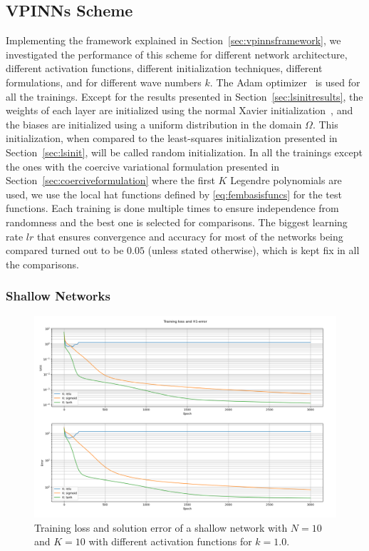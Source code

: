 \subsection{VPINNs Scheme}\label{sec:vpinnsresults}
Implementing the framework explained in Section~\ref{sec:vpinnsframework}, we investigated the performance of this scheme for different network architecture, different activation functions, different initialization techniques, different formulations, and for different wave numbers $k$. The Adam optimizer~\cite{adamoptimizer} is used for all the trainings. Except for the results presented in Section~\ref{sec:lsinitresults}, the weights of each layer are initialized using the normal Xavier initialization~\cite{xavierinitialization}, and the biases are initialized using a uniform distribution in the domain $\Omega$. This initialization, when compared to the least-squares initialization presented in Section~\ref{sec:lsinit}, will be called random initialization. In all the trainings except the ones with the coercive variational formulation presented in Section~\ref{sec:coerciveformulation} where the first $K$ Legendre polynomials are used, we use the local hat functions defined by \eqref{eq:fembasisfuncs} for the test functions. Each training is done multiple times to ensure independence from randomness and the best one is selected for comparisons. The biggest learning rate $lr$ that ensures convergence and accuracy for most of the networks being compared turned out to be $0.05$ (unless stated otherwise), which is kept fix in all the comparisons.

\subsubsection{Shallow Networks} \label{sec:vpinnsshallowresults}

\begin{figure}[h!]
    \centering
    \includegraphics[width=.7\textwidth]{img/VPINN-Comparison-Activation.png}
    \caption{Training loss and solution error of a shallow network with $N=10$ and $K=10$ with different activation functions for $k=1.0$.}
    \label{fig:activationfunctions}
\end{figure}

